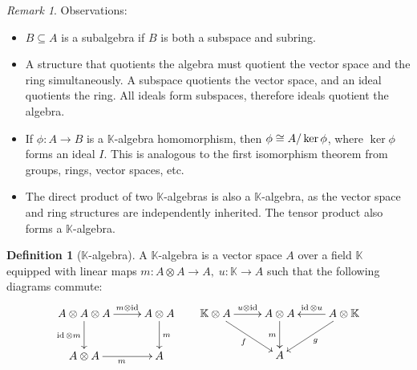 \documentclass{article}
\theoremstyle{definition}
\newtheorem{Definition}{Definition}
\theoremstyle{remark}
\newtheorem*{Remark*}{Remark}
\theoremstyle{underline}
\theoremstyle{underline}
\let\Im\relax
\DeclareMathOperator{\Im}{Im}
\DeclareMathOperator{\id}{id}
\begin{document}
\begin{Remark*}
Observations:
\begin{itemize}
	\item $ B \subseteq A $ is a subalgebra if $B$ is both a subspace and subring. 
	\item A structure that quotients the algebra must quotient the vector space and the ring simultaneously. A subspace quotients the vector space, and an ideal quotients the ring. All ideals form subspaces, therefore ideals quotient the algebra. 
	\item If $\phi \colon A \to B $ is a $\mathbb K$-algebra homomorphism, then $\Im \phi \cong A/\ker \phi$, where $\ker\phi$ forms an ideal $I$. This is analogous to the first isomorphism theorem from groups, rings, vector spaces, etc.
	\item The direct product of two $\mathbb K$-algebras is also a $\mathbb K$-algebra, as the vector space and ring structures are independently inherited. The tensor product also forms a $\mathbb K$-algebra.
\end{itemize}
\end{Remark*}

\begin{Definition}[$\mathbb K$-algebra]
A $\mathbb K$-algebra is a vector space $A$ over a field $\mathbb K$ equipped with linear maps $ m\colon A \otimes A \to A,\; u\colon \mathbb K \to A $ such that the following diagrams commute:
\begin{equation*}
\xymatrix{
A \otimes A \otimes A \ar[d]_{\id \otimes m} \ar[r]^-{m \otimes \id} & A \otimes A \ar[d]^{m} \\
A \otimes A \ar[r]_{m} & A
} \;\;\;\;\;\;
\xymatrix{
\mathbb K \otimes A \ar[r]^{u \otimes \id} \ar[dr]_{f} & A \otimes A \ar[d]_{m} & A \otimes \mathbb K \ar[l]_{\id \otimes u} \ar[dl]^{g} \\
	& A &	
}
\end{equation*}
\end{Definition}
\end{document}
